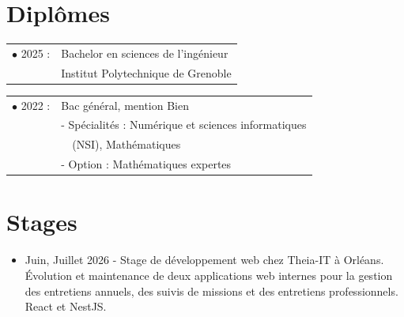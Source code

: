 \documentclass[10pt,oneside,a4paper,titlepage]{article}
\begin{document}
\begin{tcolorbox}
\begin{minipage}[t]{11.6cm}
\begin{tcolorbox}[grow to right by=0.75cm,colframe=white,colback=white]
      \section*{Diplômes}
      \begin{tabular}{ll}
        $\bullet$ 2025 : & Bachelor en sciences de l'ingénieur\\
                         & Institut Polytechnique de Grenoble
      \end{tabular}

      \vspace{1em}
      \begin{tabular}{ll}
        $\bullet$ 2022 : & Bac général, mention Bien\\
                         & - Spécialités : Numérique et sciences informatiques\\
                         &\ \ (NSI), Mathématiques\\
                         & - Option : Mathématiques expertes
      \end{tabular}

      \section*{Stages}
      \begin{itemize}
      \item Juin, Juillet 2026 - Stage de développement web chez Theia-IT à Orléans.\\
        Évolution et maintenance de deux applications web internes pour la gestion des entretiens annuels, des suivis de missions et des entretiens professionnels. React et NestJS.
      \end{itemize}


\end{tcolorbox}
\end{minipage}
\end{tcolorbox}
\end{document}
